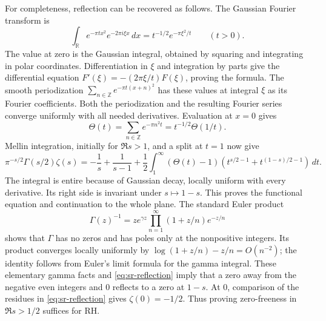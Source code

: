For completeness, reflection can be recovered as follows.
The Gaussian Fourier transform is
\[
 \int_{\mathbb R}e^{-\pi t x^2}e^{-2\pi i\xi x}\,dx
 =t^{-1/2}e^{-\pi\xi^2/t}\qquad(t>0).
\]
The value at zero is the Gaussian integral, obtained by squaring and
integrating in polar coordinates. Differentiation in \(\xi\) and
integration by parts give the differential equation
\(F'(\xi)=-(2\pi\xi/t)F(\xi)\), proving the formula.
The smooth periodization \(\sum_{n\in\mathbb Z}e^{-\pi t(x+n)^2}\)
has these values at integral \(\xi\) as its Fourier coefficients.
Both the periodization and the resulting Fourier series converge
uniformly with all needed derivatives. Evaluation at \(x=0\) gives
\[
 \Theta(t)=\sum_{n\in\mathbb Z}e^{-\pi n^2t}
 =t^{-1/2}\Theta(1/t).
\]
Mellin integration, initially for \(\Re s>1\), and a split at \(t=1\)
now give
\begin{equation}\label{eq:sr-reflection}
 \pi^{-s/2}\Gamma(s/2)\zeta(s)
 =-\frac1s+\frac1{s-1}
 +\frac12\int_1^\infty(\Theta(t)-1)
 \left(t^{s/2-1}+t^{(1-s)/2-1}\right)\,dt .
\end{equation}
The integral is entire because of Gaussian decay, locally uniform with
every derivative. Its right side is invariant under \(s\mapsto1-s\).
This proves the functional equation and continuation to the whole plane.
The standard Euler product
\[
 \Gamma(z)^{-1}=z e^{\gamma z}
       \prod_{n=1}^{\infty}(1+z/n)e^{-z/n}
\]
shows that \(\Gamma\) has no zeros and has poles only at the nonpositive
integers. Its product converges locally uniformly by
\(\log(1+z/n)-z/n=O(n^{-2})\); the identity follows from Euler's
limit formula for the gamma integral. These elementary gamma facts and
\eqref{eq:sr-reflection} imply that a zero away from the negative even
integers and \(0\) reflects to a zero at \(1-s\).
At \(0\), comparison of the residues in \eqref{eq:sr-reflection} gives
\(\zeta(0)=-1/2\). Thus proving zero-freeness in \(\Re s>1/2\)
suffices for RH.

